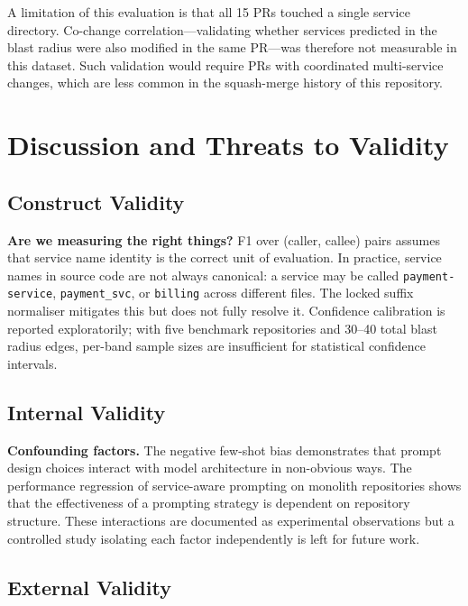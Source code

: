 \documentclass[runningheads]{llncs}
\begin{document}
A limitation of this evaluation is that all 15 PRs touched a single service
directory. Co-change correlation---validating whether services predicted in
the blast radius were also modified in the same PR---was therefore not
measurable in this dataset. Such validation would require PRs with
coordinated multi-service changes, which are less common in the squash-merge
history of this repository.

\section{Discussion and Threats to Validity}
\label{sec:discussion}

\subsection{Construct Validity}

\textbf{Are we measuring the right things?} F1 over (caller, callee) pairs
assumes that service name identity is the correct unit of evaluation. In
practice, service names in source code are not always canonical: a service
may be called \texttt{payment-service}, \texttt{payment\_svc}, or
\texttt{billing} across different files. The locked suffix normaliser
mitigates this but does not fully resolve it. Confidence calibration is
reported exploratorily; with five benchmark repositories and 30--40 total
blast radius edges, per-band sample sizes are insufficient for statistical
confidence intervals.

\subsection{Internal Validity}

\textbf{Confounding factors.} The negative few-shot bias demonstrates
that prompt design choices interact with model architecture in non-obvious
ways. The performance regression of service-aware prompting on monolith
repositories shows that the effectiveness of a prompting strategy is
dependent on repository structure. These interactions are documented as
experimental observations but a controlled study isolating each factor
independently is left for future work.

\subsection{External Validity}
\end{document}
